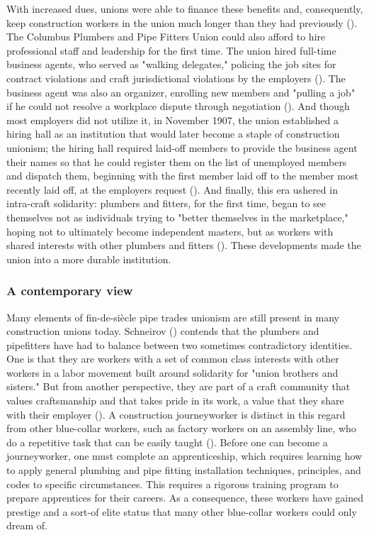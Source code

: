 \documentclass[12pt]{article}
\begin{document}
With increased dues, unions were able to finance these benefits and, consequently, keep construction workers in the union much longer than they had previously (\cite[59]{schneirovPrideSolidarityHistory1993}). The Columbus Plumbers and Pipe Fitters Union could also afford to hire professional staff and leadership for the first time. The union hired full-time business agents, who served as "walking delegates," policing the job sites for contract violations and craft jurisdictional violations by the employers (\citeyear[60]{schneirovPrideSolidarityHistory1993}). The business agent was also an organizer, enrolling new members and "pulling a job" if he could not resolve a workplace dispute through negotiation (\citeyear[60]{schneirovPrideSolidarityHistory1993}). And though most employers did not utilize it, in November 1907, the union established a hiring hall as an institution that would later become a staple of construction unionism; the hiring hall required laid-off members to provide the business agent their names so that he could register them on the list of unemployed members and dispatch them, beginning with the first member laid off to the member most recently laid off, at the employers request (\citeyear[60–61]{schneirovPrideSolidarityHistory1993}). And finally, this era ushered in intra-craft solidarity: plumbers and fitters, for the first time, began to see themselves not as individuals trying to "better themselves in the marketplace," hoping not to ultimately become independent masters, but as workers with shared interests with other plumbers and fitters (\citeyear[61]{schneirovPrideSolidarityHistory1993}). These developments made the union into a more durable institution.

\subsubsection{A contemporary view}

Many elements of fin-de-si\`{e}cle pipe trades unionism are still present in many construction unions today. Schneirov (\citeyear{schneirovPrideSolidarityHistory1993}) contends that the plumbers and pipefitters have had to balance between two sometimes contradictory identities. One is that they are workers with a set of common class interests with other workers in a labor movement built around solidarity for "union brothers and sisters." But from another perspective, they are part of a craft community that values craftsmanship and that takes pride in its work, a value that they share with their employer (\cite[3--4]{schneirovPrideSolidarityHistory1993}). A construction journeyworker is distinct in this regard from other blue-collar workers, such as factory workers on an assembly line, who do a repetitive task that can be easily taught (\cite[5]{schneirovPrideSolidarityHistory1993}). Before one can become a journeyworker, one must complete an apprenticeship, which requires learning how to apply general plumbing and pipe fitting installation techniques, principles, and codes to specific circumstances. This requires a rigorous training program to prepare apprentices for their careers. As a consequence, these workers have gained prestige and a sort-of elite status that many other blue-collar workers could only dream of.
\end{document}
